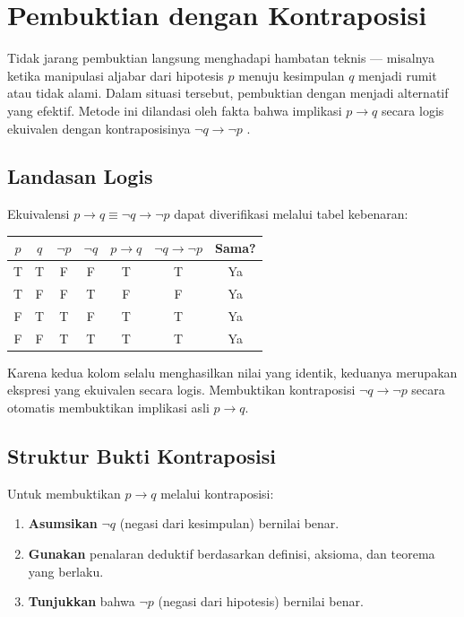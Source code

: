 \section{Pembuktian dengan Kontraposisi}

Tidak jarang pembuktian langsung menghadapi hambatan teknis --- misalnya ketika manipulasi aljabar dari hipotesis $p$ menuju kesimpulan $q$ menjadi rumit atau tidak alami. Dalam situasi tersebut, pembuktian dengan  menjadi alternatif yang efektif. Metode ini dilandasi oleh fakta bahwa implikasi $p \rightarrow q$ secara logis ekuivalen dengan kontraposisinya $\neg q \rightarrow \neg p$ \cite{rosen2019,forallx,libretexts_proofs}.

\subsection{Landasan Logis}

Ekuivalensi $p \rightarrow q \equiv \neg q \rightarrow \neg p$ dapat diverifikasi melalui tabel kebenaran:

\begin{center}
\renewcommand{\arraystretch}{1.2}
\begin{tabular}{|c|c||c|c|c|c||c|}
\hline
$p$ & $q$ & $\neg p$ & $\neg q$ & $p \rightarrow q$ & $\neg q \rightarrow \neg p$ & Sama? \\ \hline
T & T & F & F & T & T & Ya \\ \hline
T & F & F & T & F & F & Ya \\ \hline
F & T & T & F & T & T & Ya \\ \hline
F & F & T & T & T & T & Ya \\ \hline
\end{tabular}
\end{center}

Karena kedua kolom selalu menghasilkan nilai yang identik, keduanya merupakan ekspresi yang ekuivalen secara logis. Membuktikan kontraposisi $\neg q \rightarrow \neg p$ secara otomatis membuktikan implikasi asli $p \rightarrow q$.

\subsection{Struktur Bukti Kontraposisi}

Untuk membuktikan $p \rightarrow q$ melalui kontraposisi:

\begin{enumerate}
    \item \textbf{Asumsikan} $\neg q$ (negasi dari kesimpulan) bernilai benar.
    \item \textbf{Gunakan} penalaran deduktif berdasarkan definisi, aksioma, dan teorema yang berlaku.
    \item \textbf{Tunjukkan} bahwa $\neg p$ (negasi dari hipotesis) bernilai benar.
\end{enumerate}

